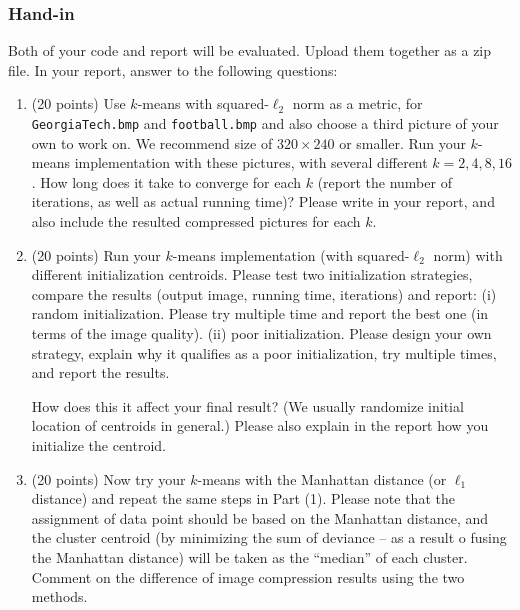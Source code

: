 \documentclass[twoside,10pt]{article}
\begin{document}
\subsubsection*{Hand-in}
Both of your code and report will be evaluated. Upload them together as a zip file. In your report, answer to the following questions:
\begin{enumerate}
  \item (20 points) Use $k$-means with squared-$\ell_2$ norm as a metric, for \texttt{GeorgiaTech.bmp} and \texttt{football.bmp} and also choose a third picture of your own to work on. We recommend size of $320 \times 240$ or smaller. Run your $k$-means implementation with these pictures, with several different $k = 2, 4, 8, 16$. How long does it take to converge for each $k$ (report the number of iterations, as well as actual running time)? Please write in your report, and also include the resulted compressed pictures for each $k$.
  \item (20 points) Run your $k$-means implementation (with squared-$\ell_2$ norm) with different initialization centroids. Please test two initialization strategies, compare the results (output image, running time, iterations) and report: (i)
random initialization. Please try multiple time and report the best one (in terms of the image quality).
(ii) poor initialization. Please design your own strategy, explain why it qualifies as a poor initialization, try multiple times, and report the results.
  
  How does this it affect your final result? (We usually randomize initial location of centroids in general.) Please also explain in the report how you initialize the centroid.
   \item (20 points) Now try your $k$-means with the Manhattan distance (or $\ell_1$ distance) and repeat the same steps in Part (1). Please note that the assignment of data point should be based on the Manhattan distance, and the cluster centroid (by minimizing the sum of deviance -- as a result o fusing the Manhattan distance) will be taken as the ``median'' of each cluster. Comment on the difference of image compression results using the two methods.
\end{enumerate}
\end{document}
